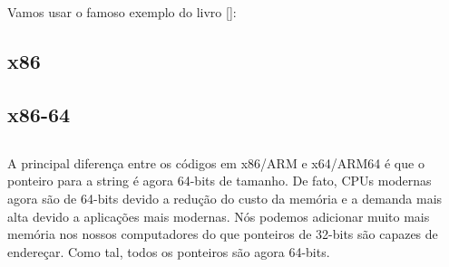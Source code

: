 \section{\HelloWorldSectionName}
\label{sec:helloworld}

Vamos usar o famoso exemplo do livro [\KRBook]:



\subsection{x86}




\subsection{x86-64}







\subsection{\Conclusion{}}

A principal diferença entre os códigos em x86/ARM e x64/ARM64 é que o ponteiro para a string é agora 64-bits de tamanho.
De fato, \ac{CPU}s modernas agora são de 64-bits devido a redução do custo da memória e a demanda mais alta devido a aplicações mais modernas.
Nós podemos adicionar muito mais memória nos nossos computadores do que ponteiros de 32-bits são capazes de endereçar.
Como tal, todos os ponteiros são agora 64-bits.



